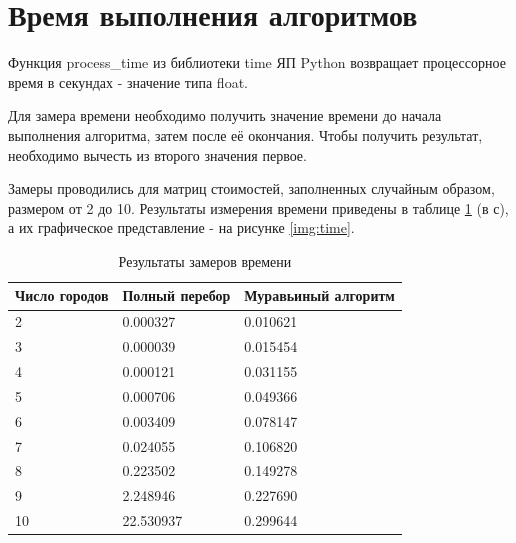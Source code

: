 \section{Время выполнения алгоритмов}

Функция process\_time из библиотеки time ЯП Python возвращает  процессорное время в секундах - значение типа float.

Для замера времени необходимо получить значение времени до начала выполнения алгоритма, затем после её окончания. Чтобы получить результат, необходимо вычесть из второго значения первое.

Замеры проводились для матриц стоимостей, заполненных случайным образом, размером от 2 до 10. Результаты измерения времени приведены в таблице \ref{tbl:time} (в с), а их графическое представление - на рисунке \ref{img:time}.

\begin{center}
\captionsetup{justification=raggedright,singlelinecheck=off}
\begin{longtable}[c]{|p{4cm}|p{4cm}|p{4cm}|}
\caption{Результаты замеров времени\label{tbl:time}}\\ \hline
   Число городов & Полный перебор & Муравьиный алгоритм \\ \hline
   2 &   0.000327 &   0.010621 \\ \hline
   3 &   0.000039 &   0.015454 \\ \hline
   4 &   0.000121 &   0.031155 \\ \hline
   5 &   0.000706 &   0.049366 \\ \hline
   6 &   0.003409 &   0.078147 \\ \hline
   7 &   0.024055 &   0.106820 \\ \hline
   8 &   0.223502 &   0.149278 \\ \hline
   9 &   2.248946 &   0.227690 \\ \hline
  10 &  22.530937 &   0.299644 \\ \hline
\end{longtable}
\end{center}

